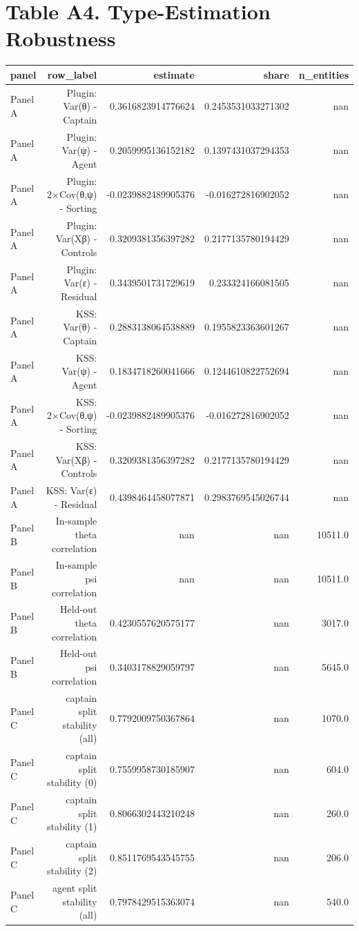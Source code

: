\documentclass{article}
\begin{document}
\section*{Table A4. Type-Estimation Robustness}
\begin{tabular}{lrrrr}
\hline
panel & row_label & estimate & share & n_entities \\
\hline
Panel A & Plugin: Var(θ) - Captain & 0.3616823914776624 & 0.2453531033271302 & nan \\
Panel A & Plugin: Var(ψ) - Agent & 0.2059995136152182 & 0.1397431037294353 & nan \\
Panel A & Plugin: 2×Cov(θ,ψ) - Sorting & -0.0239882489905376 & -0.016272816902052 & nan \\
Panel A & Plugin: Var(Xβ) - Controls & 0.3209381356397282 & 0.2177135780194429 & nan \\
Panel A & Plugin: Var(ε) - Residual & 0.3439501731729619 & 0.233324166081505 & nan \\
Panel A & KSS: Var(θ) - Captain & 0.2883138064538889 & 0.1955823363601267 & nan \\
Panel A & KSS: Var(ψ) - Agent & 0.1834718260041666 & 0.1244610822752694 & nan \\
Panel A & KSS: 2×Cov(θ,ψ) - Sorting & -0.0239882489905376 & -0.016272816902052 & nan \\
Panel A & KSS: Var(Xβ) - Controls & 0.3209381356397282 & 0.2177135780194429 & nan \\
Panel A & KSS: Var(ε) - Residual & 0.4398464458077871 & 0.2983769545026744 & nan \\
Panel B & In-sample theta correlation & nan & nan & 10511.0 \\
Panel B & In-sample psi correlation & nan & nan & 10511.0 \\
Panel B & Held-out theta correlation & 0.4230557620575177 & nan & 3017.0 \\
Panel B & Held-out psi correlation & 0.3403178829059797 & nan & 5645.0 \\
Panel C & captain split stability (all) & 0.7792009750367864 & nan & 1070.0 \\
Panel C & captain split stability (0) & 0.7559958730185907 & nan & 604.0 \\
Panel C & captain split stability (1) & 0.8066302443210248 & nan & 260.0 \\
Panel C & captain split stability (2) & 0.8511769543545755 & nan & 206.0 \\
Panel C & agent split stability (all) & 0.7978429515363074 & nan & 540.0 \\

\end{tabular}
\end{document}
